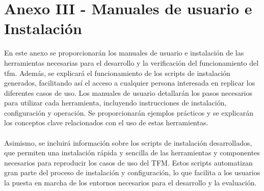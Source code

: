 \chapter{Anexo III - Manuales de usuario e Instalación}


En este anexo se proporcionarán los manuales de usuario e instalación de las herramientas necesarias para el desarrollo y la verificación del funcionamiento del \gls{tfm}. Además, se explicará el funcionamiento de los scripts de instalación generados, facilitando así el acceso a cualquier persona interesada en replicar los diferentes casos de uso. Los manuales de usuario detallarán los pasos necesarios para utilizar cada herramienta, incluyendo instrucciones de instalación, configuración y operación. Se proporcionarán ejemplos prácticos y se explicarán los conceptos clave relacionados con el uso de estas herramientas.\\
\\
Asimismo, se incluirá información sobre los scripts de instalación desarrollados, que permiten una instalación rápida y sencilla de las herramientas y componentes necesarios para reproducir los casos de uso del TFM. Estos scripts automatizan gran parte del proceso de instalación y configuración, lo que facilita a los usuarios la puesta en marcha de los entornos necesarios para el desarrollo y la evaluación.

